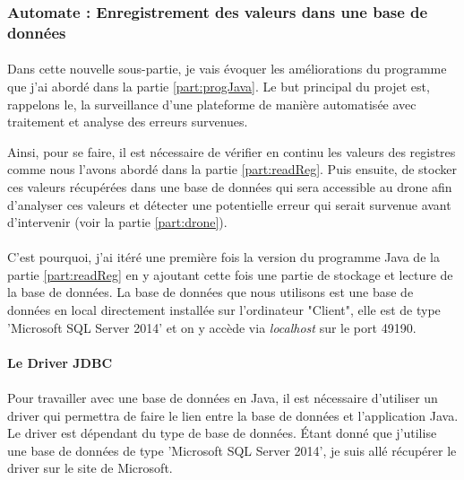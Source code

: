     \subsubsection{Automate : Enregistrement des valeurs dans une base de données}
        \paragraph*{}
        Dans cette nouvelle sous-partie, je vais évoquer les améliorations du programme que j'ai abordé dans la partie \ref{part:progJava}. Le but principal du projet est, rappelons le, la surveillance d'une plateforme de manière automatisée avec traitement et analyse des erreurs survenues.
        
        Ainsi, pour se faire, il est nécessaire de vérifier en continu les valeurs des registres comme nous l'avons abordé dans la partie \ref{part:readReg}. Puis ensuite, de stocker ces valeurs récupérées dans une base de données qui sera accessible au drone afin d'analyser ces valeurs et détecter une potentielle erreur qui serait survenue avant d'intervenir (voir la partie \ref{part:drone}).
        
        \paragraph*{}
        C'est pourquoi, j'ai itéré une première fois la version du programme Java de la partie \ref{part:readReg} en y ajoutant cette fois une partie de stockage et lecture de la base de données. La base de données que nous utilisons est une base de données en local directement installée sur l'ordinateur "Client", elle est de type 'Microsoft SQL Server 2014' et on y accède via \textit{localhost} sur le port 49190.
        
        \paragraph{Le Driver JDBC}
            \paragraph*{}
            Pour travailler avec une base de données en Java, il est nécessaire d'utiliser un driver qui permettra de faire le lien entre la base de données et l'application Java. Le driver est dépendant du type de base de données. Étant donné que j'utilise une base de données de type 'Microsoft SQL Server 2014', je suis allé récupérer le driver sur le site de Microsoft\cite{msDriverSQL}.
        
